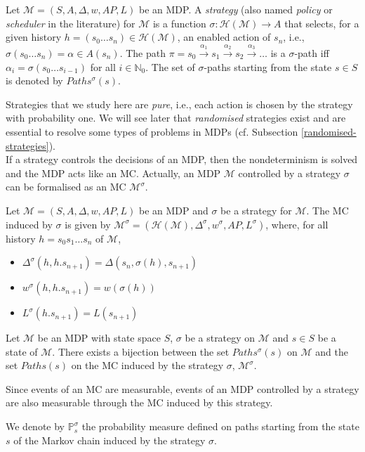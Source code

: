 \begin{definition}
Let $\mathcal{M} = (S, A, \Delta, w, AP, L)$ be an MDP. A \textit{strategy} (also named \textit{policy} or \textit{scheduler} in the literature) for $\mathcal{M}$
	is a function
	$\sigma: \mathcal{H}(\mathcal{M}) \rightarrow A$
	that selects, for a given history $h = (s_0 \dots s_n) \in \mathcal{H}(\mathcal{M})$, an enabled action of $s_n$, i.e., $\sigma(s_0 \dots s_n) = \alpha \in A(s_n)$.
	The path $\pi = s_0 \xrightarrow{\alpha_1} s_1 \xrightarrow{\alpha_2} s_2 \xrightarrow{\alpha_3} \dots$
	is a $\sigma$-path iff $\alpha_i = \sigma(s_0 \dots s_{i-1})$
	for all $i \in \mathbb{N}_0$. The set of $\sigma$-paths starting from the state $s \in S$ is denoted by $Paths^\sigma(s)$.
\end{definition}
Strategies that we study here are \textit{pure}, i.e., each action is chosen by the strategy with probability one. We will see later that \textit{randomised} strategies exist and are essential to resolve some types of problems in MDPs (cf. Subsection \ref{randomised-strategies}). \\

If a strategy controls the decisions of an MDP, then the nondeterminism is solved
and the MDP acts like an MC. Actually, an MDP $\mathcal{M}$ controlled by a strategy $\sigma$ can be formalised as an MC $\mathcal{M}^\sigma$.

\begin{definition}
Let \sloppy$\mathcal{M} = (S, A, \Delta, w, AP, L)$ be an MDP and $\sigma$ be a strategy for
$\mathcal{M}$. The MC induced by $\sigma$ is given by
$ \mathcal{M}^\sigma = (\mathcal{H}(\mathcal{M}), \Delta^\sigma, w^\sigma, AP, L^\sigma) $, where, for all history
$h = s_0 s_1 \dots s_n$ of $\mathcal{M}$,
\begin{itemize}
\item $\Delta^\sigma(h, h . s_{n+1}) = \Delta(s_n, \sigma(h), s_{n+1})$
\item $w^\sigma(h, h . s_{n+1}) = w(\sigma(h))$
\item $L^\sigma(h . s_{n+1}) = L(s_{n+1})$
\end{itemize}
\end{definition}
\begin{property}
  Let $\mathcal{M}$ be an MDP with state space $S$, $\sigma$ be a strategy on $\mathcal{M}$ and $s\in S$ be a state of $\mathcal{M}$. There exists a bijection between the
  set $Paths^\sigma(s)$ on $\mathcal{M}$ and the set $Paths(s)$ on the MC induced by the strategy $\sigma$, $\mathcal{M}^\sigma$.
\end{property}
Since events of an MC are measurable, events of an MDP controlled by a strategy are also measurable through the MC induced by this strategy.
\begin{notation}
  We denote by $\mathbb{P}_s^\sigma$ the probability measure defined on paths starting from the state $s$ of the Markov chain induced by the strategy $\sigma$.
\end{notation}

